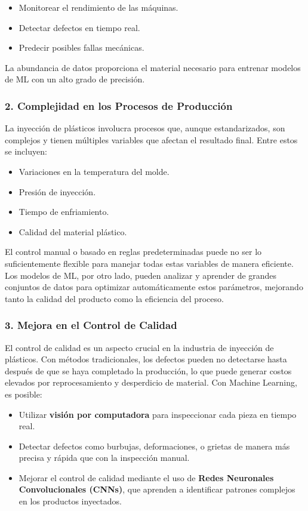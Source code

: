 \begin{itemize}
    \item Monitorear el rendimiento de las máquinas.
    \item Detectar defectos en tiempo real.
    \item Predecir posibles fallas mecánicas.
\end{itemize}

La abundancia de datos proporciona el material necesario para entrenar modelos de ML con un alto grado de precisión.

\subsubsection{2. Complejidad en los Procesos de Producción}

La inyección de plásticos involucra procesos que, aunque estandarizados, son complejos y tienen múltiples variables que afectan el resultado final. Entre estos se incluyen:

\begin{itemize}
    \item Variaciones en la temperatura del molde.
    \item Presión de inyección.
    \item Tiempo de enfriamiento.
    \item Calidad del material plástico.
\end{itemize}

El control manual o basado en reglas predeterminadas puede no ser lo suficientemente flexible para manejar todas estas variables de manera eficiente. Los modelos de ML, por otro lado, pueden analizar y aprender de grandes conjuntos de datos para optimizar automáticamente estos parámetros, mejorando tanto la calidad del producto como la eficiencia del proceso.

\subsubsection{3. Mejora en el Control de Calidad}

El control de calidad es un aspecto crucial en la industria de inyección de plásticos. Con métodos tradicionales, los defectos pueden no detectarse hasta después de que se haya completado la producción, lo que puede generar costos elevados por reprocesamiento y desperdicio de material. Con Machine Learning, es posible:

\begin{itemize}
    \item Utilizar \textbf{visión por computadora} para inspeccionar cada pieza en tiempo real.
    \item Detectar defectos como burbujas, deformaciones, o grietas de manera más precisa y rápida que con la inspección manual.
    \item Mejorar el control de calidad mediante el uso de \textbf{Redes Neuronales Convolucionales (CNNs)}, que aprenden a identificar patrones complejos en los productos inyectados.
\end{itemize}


